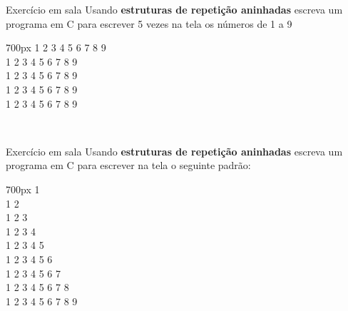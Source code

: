 \documentclass[portuguese,10pt,xcolor=table]{bredelebeamer}
\begin{document}
	\begin{frame}
	\begin{alertblock}{ Exercício em sala}
		Usando \textbf{estruturas de repetição aninhadas} escreva um programa em C para escrever 5 vezes na tela os números de 1 a 9\\
		\colorbox{gray!15}{
			\begin{varwidth}{700px}
				1 2 3 4 5 6 7 8 9\\
				1 2 3 4 5 6 7 8 9\\
				1 2 3 4 5 6 7 8 9\\
				1 2 3 4 5 6 7 8 9\\
				1 2 3 4 5 6 7 8 9\\
			\end{varwidth}
		}\\
	\end{alertblock}
	\end{frame}

	\begin{frame}
	\begin{alertblock}{ Exercício em sala}
		Usando \textbf{estruturas de repetição aninhadas} escreva um programa em C para escrever na tela o seguinte padrão:\\
		\colorbox{gray!15}{
			\begin{varwidth}{700px}
				1\\
				1 2\\
				1 2 3\\
				1 2 3 4\\
				1 2 3 4 5\\
				1 2 3 4 5 6\\
				1 2 3 4 5 6 7\\
				1 2 3 4 5 6 7 8\\
				1 2 3 4 5 6 7 8 9
			\end{varwidth}
		}\\
	\end{alertblock}
	\end{frame}
\end{document}

